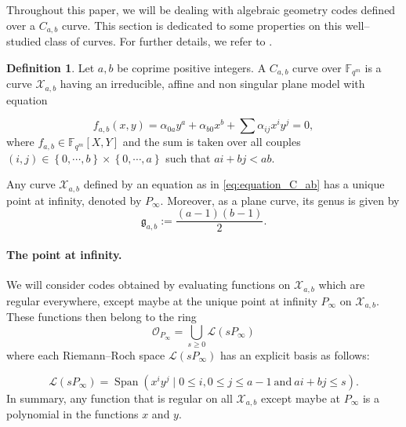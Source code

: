 \documentclass[a4paper]{article}
\theoremstyle{definition}
\newtheorem{definition}[thm]{Definition}
\theoremstyle{remark}
\newcommand{\calL}{\mathcal{L}}
\newcommand{\calX}{\mathcal{X}}
\newcommand{\fqm}{\mathbb{F}_{q^m}}
\newcommand{\set}[1]{\left\{#1\right\}}
\newcommand{\Span}[1]{\operatorname{Span}\left(#1\right)}
\begin{document}
Throughout this paper, we will be dealing with algebraic geometry codes defined over a $C_{a,b}$ curve. This section is dedicated to some properties on this well--studied class of curves. For further details, we refer to \cite{Miu93}. 


\begin{definition} \label{def:C_ab_curves} 
Let $a,b$ be coprime positive integers. A $C_{a,b}$ curve over $\fqm$ is a curve $\calX_{a,b}$ having an irreducible, affine and non singular plane model with equation

\begin{equation} \label{eq:equation_C_ab}
f_{a,b}(x,y) = \alpha_{0a}y^a + \alpha_{b0}x^b + \sum \alpha_{ij}x^iy^j = 0,
\end{equation}
where $f_{a,b} \in \fqm[X,Y]$ and the sum is taken over all couples $(i,j) \in \set{0,\cdots,b} \times \set{0,\cdots,a}$ such that $ai+bj < ab$.
\end{definition}

Any curve $\calX_{a,b}$ defined by an equation as in \eqref{eq:equation_C_ab} has a unique point at infinity, denoted by $P_{\infty}$. Moreover, as a plane curve, its genus is given by
\[\mathfrak{g}_{a,b}:=\dfrac{(a-1)(b-1)}{2}.\]




\paragraph{The point at infinity.} We will consider codes obtained by evaluating functions on $\calX_{a,b}$ which are regular everywhere, except maybe at the unique point at infinity $P_\infty$ on $\calX_{a,b}$. These functions then belong to the ring 
\begin{equation}\label{eq:O_Pinf}
\mathcal{O}_{P_\infty}=\bigcup_{s \geq 0} \calL(s P_\infty)
\end{equation} %
where each Riemann--Roch space $\calL(s P_\infty)$ has an explicit basis as follows:

\begin{equation} \label{eq:basis_L(sP_inf)}
    \calL(sP_{\infty}) = \Span{x^iy^j \mid 0 \leq i, 0\leq j\leq a-1 \ \mathrm{and} \ ai+bj \leq s}.
\end{equation}
%
In summary, any function that is regular on all $\calX_{a,b}$ except maybe at $P_\infty$ is a polynomial in the functions $x$ and $y$. 
\end{document}
